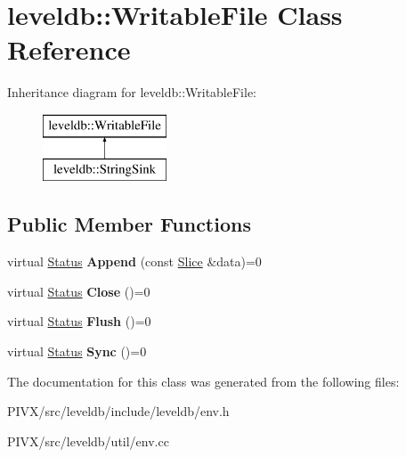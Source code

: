 \hypertarget{classleveldb_1_1_writable_file}{}\section{leveldb\+:\+:Writable\+File Class Reference}
\label{classleveldb_1_1_writable_file}
Inheritance diagram for leveldb\+:\+:Writable\+File\+:\begin{figure}[H]
\begin{center}
\leavevmode
\includegraphics[height=2.000000cm]{classleveldb_1_1_writable_file}
\end{center}
\end{figure}
\subsection*{Public Member Functions}
\begin{DoxyCompactItemize}
\item 
\mbox{\label{classleveldb_1_1_writable_file_a53b41841d9577d28f65d4d90e1660de8}} 
virtual \mbox{\hyperlink{classleveldb_1_1_status}{Status}} {\bfseries Append} (const \mbox{\hyperlink{classleveldb_1_1_slice}{Slice}} \&data)=0
\item 
\mbox{\label{classleveldb_1_1_writable_file_a2efbf9c02a26028b5002df73b4393915}} 
virtual \mbox{\hyperlink{classleveldb_1_1_status}{Status}} {\bfseries Close} ()=0
\item 
\mbox{\label{classleveldb_1_1_writable_file_ab95759ad32f6a05b0ee4266969fa265e}} 
virtual \mbox{\hyperlink{classleveldb_1_1_status}{Status}} {\bfseries Flush} ()=0
\item 
\mbox{\label{classleveldb_1_1_writable_file_a2d2dcef02a2c9e71f3d39125bcd5a606}} 
virtual \mbox{\hyperlink{classleveldb_1_1_status}{Status}} {\bfseries Sync} ()=0
\end{DoxyCompactItemize}


The documentation for this class was generated from the following files\+:\begin{DoxyCompactItemize}
\item 
P\+I\+V\+X/src/leveldb/include/leveldb/env.\+h\item 
P\+I\+V\+X/src/leveldb/util/env.\+cc\end{DoxyCompactItemize}
